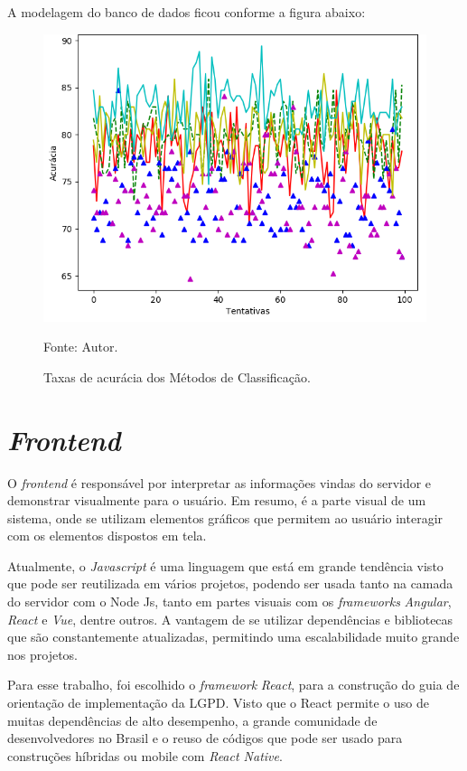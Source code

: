 \documentclass[
	12pt,				%
	openright,			%
	oneside,			%
	a4paper,			%
	english,			%
	french,				%
	spanish,			%
	brazil,				%
	]{abntex2}
\begin{document}
A modelagem do banco de dados ficou conforme a figura abaixo:

\begin{figure}[ht]
    \centering
    \caption{Taxas de acurácia dos Métodos de Classificação.}
    \includegraphics[width=5.0in]{Images/acc-classification.png}
    \label{fig: grafico-acc}
    
    \centering \small Fonte: Autor.
\end{figure}

\section{\textit{Frontend}}

O \textit{frontend} é responsável por interpretar as informações vindas do servidor e demonstrar visualmente para o usuário. Em resumo, é a parte visual de um sistema, onde se utilizam elementos gráficos que permitem ao usuário interagir com os elementos dispostos em tela.

Atualmente, o \textit{Javascript} é uma linguagem que está em grande tendência visto que pode ser reutilizada em vários projetos, podendo ser usada tanto na camada do servidor com o Node Js, tanto em partes visuais com os \textit{frameworks} \textit{Angular}, \textit{React} e \textit{Vue}, dentre outros. A vantagem de se utilizar dependências e bibliotecas que são constantemente atualizadas, permitindo uma escalabilidade muito grande nos projetos.

Para esse trabalho, foi escolhido o \textit{framework}  \textit{React}, para a construção do guia de orientação de implementação da LGPD. Visto que o React permite o uso de muitas dependências de alto desempenho, a grande comunidade de desenvolvedores no Brasil e o reuso de códigos que pode ser usado para construções híbridas ou mobile com \textit{React Native}.
\end{document}
